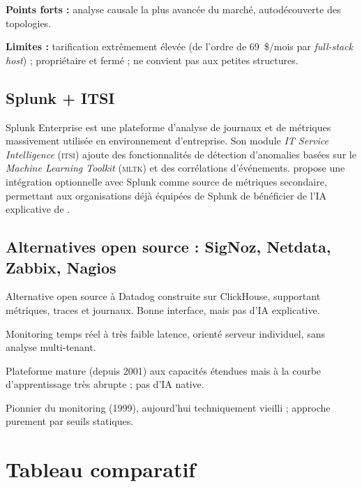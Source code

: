 \textbf{Points forts :} analyse causale la plus avancée du marché, autodécouverte
des topologies.

\textbf{Limites :} tarification extrêmement élevée (de l'ordre de 69~\$/mois
par \textit{full-stack host}) ; propriétaire et fermé ; ne convient pas aux petites
structures.

\subsection{Splunk + ITSI}

Splunk Enterprise est une plateforme d'analyse de journaux et de métriques
massivement utilisée en environnement d'entreprise. Son module \textit{IT Service
Intelligence} (\textsc{itsi}) \cite{splunk_itsi} ajoute des fonctionnalités de
détection d'anomalies basées sur le \textit{Machine Learning Toolkit} (\textsc{mltk})
et des corrélations d'événements. \caimp{} propose une intégration optionnelle
avec Splunk comme source de métriques secondaire, permettant aux organisations
déjà équipées de Splunk de bénéficier de l'IA explicative de \caimp{}.

\subsection{Alternatives open source : SigNoz, Netdata, Zabbix, Nagios}

\begin{description}[leftmargin=2cm]
  \item[SigNoz] Alternative open source à Datadog construite sur ClickHouse,
    supportant métriques, traces et journaux. Bonne interface, mais pas d'IA
    explicative.
  \item[Netdata] Monitoring temps réel à très faible latence, orienté serveur
    individuel, sans analyse multi-tenant.
  \item[Zabbix] Plateforme mature (depuis 2001) aux capacités étendues mais à
    la courbe d'apprentissage très abrupte ; pas d'IA native.
  \item[Nagios] Pionnier du monitoring (1999), aujourd'hui techniquement vieilli ;
    approche purement par seuils statiques.
\end{description}

\section{Tableau comparatif}

